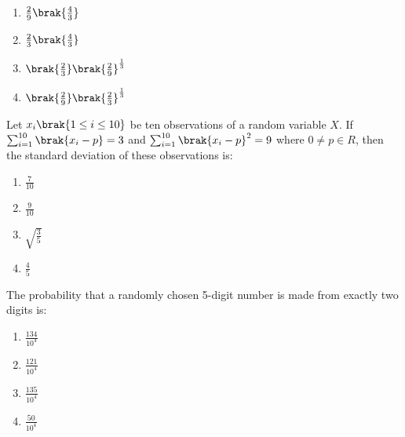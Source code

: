   \begin{multicols}{4}
\begin{enumerate}
    \item $\frac{2}{9} \brak{\frac{4}{3}}$
    \item $\frac{2}{3} \brak{\frac{4}{3}}$
    \item $\brak{\frac{2}{3}} \brak{\frac{2}{9}}^{\frac{1}{3}}$
    \item $\brak{\frac{2}{9}} \brak{\frac{2}{3}}^{\frac{1}{3}}$
\end{enumerate}
\end{multicols}

\item Let $x_{i} \brak{1 \leq i \leq 10}$ be ten observations of a random variable $X$. If
$\sum_{i=1}^{10}\brak{x_{i}-p}=3$
and
$\sum_{i=1}^{10}\brak{x_{i}-p}^{2}=9$
where $0 \neq p \in R$, then the standard deviation of these observations is:  \hfill {}

\begin{multicols}{4}
\begin{enumerate}
    \item  $\frac{7}{10}$
    \item $\frac{9}{10}$
    \item $\sqrt{\frac{3}{5}}$
    \item  $\frac{4}{5}$
\end{enumerate}
\end{multicols}

\item  The probability that a randomly chosen 5-digit number is made from exactly two digits is: \hfill {}

\begin{multicols}{4}
\begin{enumerate}
    \item $\frac{134}{10^4}$
    \item $\frac{121}{10^4}$
    \item $\frac{135}{10^4}$
    \item $\frac{50}{10^4}$
\end{enumerate}
\end{multicols}

%



